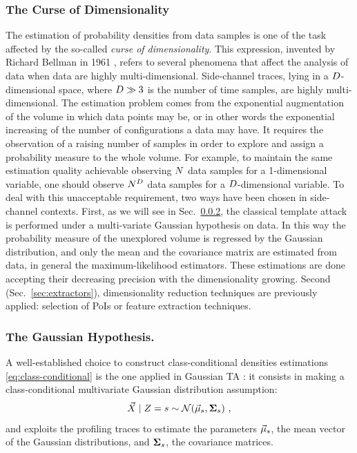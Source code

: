 \subsubsection{The Curse of Dimensionality}
The estimation of probability densities from data samples is one of the task affected by the so-called \emph{curse of dimensionality}. This expression, invented by Richard Bellman in 1961 \cite{bellman2015adaptive}, refers to several phenomena that affect the analysis of data when data are highly multi-dimensional. Side-channel traces, lying in a $D$-dimensional space, where $D\gg 3$ is the number of time samples, are highly multi-dimensional. The estimation problem comes from the exponential augmentation of the volume in which data points may be, or in other words the exponential increasing of the number of configurations a data may have. It requires the observation of a raising number of samples in order to explore and assign a probability measure to the whole volume. For example, to maintain the same estimation quality achievable observing $N$ data samples for a 1-dimensional variable, one should observe $N^D$ data samples for a $D$-dimensional variable. To deal with this unacceptable requirement, two ways have been chosen in side-channel contexts. First, as we will see in Sec.~\ref{sec:gauss_hp}, the classical template attack is performed under a multi-variate Gaussian hypothesis on data. In this way the probability measure of the unexplored volume is regressed by the Gaussian distribution, and only the mean and the covariance matrix are estimated from data, in general \via the  maximum-likelihood estimators. These estimations are done accepting their decreasing precision with the dimensionality growing. Second (Sec.~\ref{sec:extractors}), dimensionality reduction techniques are previously applied: selection of PoIs or feature extraction techniques. 

\subsubsection{The Gaussian Hypothesis.}\label{sec:gauss_hp} A well-established choice to construct class-conditional densities estimations \eqref{eq:class-conditional} is the one applied in Gaussian TA \cite{Chari2003}: it consists in making a class-conditional multivariate Gaussian distribution assumption:
\begin{equation}\label{eq:gaussian_assumption}
\given{\vaLeakVec}{\sensRandVar  = \sensVarGenValue} \sim \mathcal{N}(\mumumu_\sensVarGenValue, \boldsymbol{\Sigma}_\sensVarGenValue)\mbox{ ,}
\end{equation} 
and exploits the profiling traces to estimate the  parameters $\vec{\mu}_s$, \ie the mean vector of the Gaussian distributions, and $ \boldsymbol{\Sigma}_s$, \ie the covariance matrices. \\

